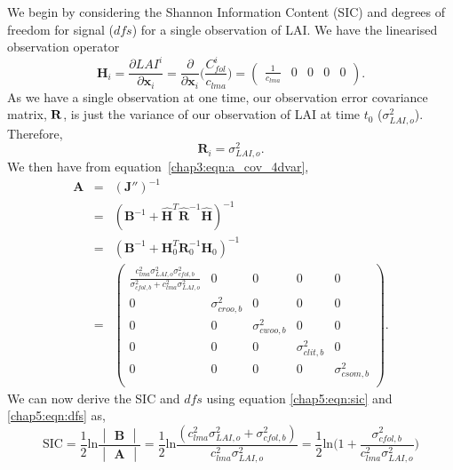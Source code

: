We begin by considering the Shannon Information Content (SIC) and degrees of freedom for signal (\(dfs\)) for a single observation of LAI. We have the linearised observation operator
\begin{equation}
\textbf{H}_{i} = \frac{\partial LAI^{i}}{\partial \textbf{x}_{i}} = \frac{\partial}{\partial \textbf{x}_{i}} \bigg( \frac{C_{fol}^{i}}{c_{lma}} \bigg) =
\begin{pmatrix}
\frac{1}{c_{lma}} & 0 & 0 & 0 & 0
\end{pmatrix}.
\end{equation}
As we have a single observation at one time, our observation error covariance matrix, $\bf{R}$, is just the variance of our observation of LAI at time $t_0$ ($\sigma_{LAI,o}^{2}$). Therefore,
\begin{equation}
\mathbf{R}_i=\sigma_{LAI,o}^{2}.
\end{equation}
We then have from equation~\eqref{chap3:eqn:a_cov_4dvar},
\begin{equation}
\begin{array} {lcl}
\mathbf{A} &=& (\mathbf{J}'')^{-1} \\
&=& (\mathbf{B}^{-1}+\hat{\mathbf{H}}^{T}\hat{\mathbf{R}}^{-1}\hat{\mathbf{H}})^{-1} \\
&=& (\mathbf{B}^{-1}+\mathbf{H}_0^{T}\mathbf{R}_0^{-1}\mathbf{H}_0)^{-1} \\
&=& \begin{pmatrix} 
\frac{c_{lma}^2 \sigma_{LAI,o}^2 \sigma_{cfol,b}^2}{\sigma_{cfol,b}^2 + c_{lma}^2 \sigma_{LAI,o}^2} & 0 & 0 & 0 & 0 \\
0 & \sigma_{croo,b}^{2} & 0 & 0 & 0 \\
0 & 0 & \sigma_{cwoo,b}^{2} & 0 & 0 \\
0 & 0 & 0 & \sigma_{clit,b}^{2} & 0 \\
0 & 0 & 0 & 0 & \sigma_{csom,b}^{2} \\
\end{pmatrix}.
\end{array}
\end{equation} 
We can now derive the SIC and $dfs$ using equation \eqref{chap5:eqn:sic} and \eqref{chap5:eqn:dfs} as,
\begin{equation}
\text{SIC} = \frac{1}{2}\text{ln}\frac{\begin{vmatrix} \mathbf{B} \end{vmatrix}}{\begin{vmatrix} \mathbf{A} \end{vmatrix}} = \frac{1}{2}\text{ln}\frac{(c_{lma}^2 \sigma_{LAI,o}^{2}+\sigma_{cfol,b}^{2})}{c_{lma}^2 \sigma_{LAI,o}^{2}}
=\frac{1}{2}\text{ln} \bigg(1+\frac{\sigma_{cfol,b}^{2}}{c_{lma}^2 \sigma_{LAI,o}^{2}}\bigg) \label{chap5:eqn:siclai}
\end{equation}
